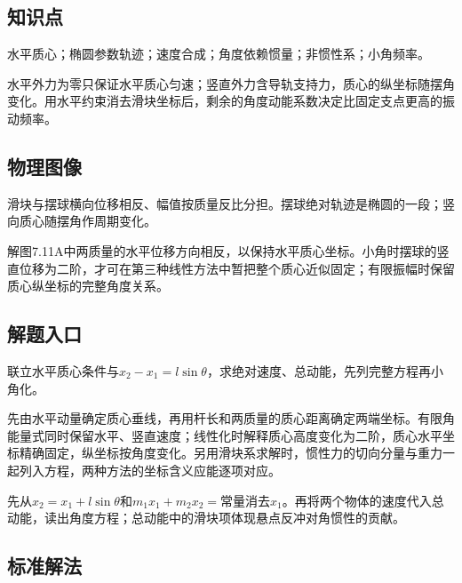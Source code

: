 \documentclass[UTF8,fontset=fandol,a4paper,11pt]{ctexart}
\begin{document}
\subsection*{知识点}

水平质心；椭圆参数轨迹；速度合成；角度依赖惯量；非惯性系；小角频率。

水平外力为零只保证水平质心匀速；竖直外力含导轨支持力，质心的纵坐标随摆角变化。用水平约束消去滑块坐标后，剩余的角度动能系数决定比固定支点更高的振动频率。




\subsection*{物理图像}

滑块与摆球横向位移相反、幅值按质量反比分担。摆球绝对轨迹是椭圆的一段；竖向质心随摆角作周期变化。

解图7.11A中两质量的水平位移方向相反，以保持水平质心坐标。小角时摆球的竖直位移为二阶，才可在第三种线性方法中暂把整个质心近似固定；有限振幅时保留质心纵坐标的完整角度关系。




\subsection*{解题入口}

联立水平质心条件与\(x_2-x_1=l\sin\theta\)，求绝对速度、总动能，先列完整方程再小角化。

先由水平动量确定质心垂线，再用杆长和两质量的质心距离确定两端坐标。有限角能量式同时保留水平、竖直速度；线性化时解释质心高度变化为二阶，质心水平坐标精确固定，纵坐标按角度变化。另用滑块系求解时，惯性力的切向分量与重力一起列入方程，两种方法的坐标含义应能逐项对应。

先从$x_2=x_1+l\sin\theta$和$m_1x_1+m_2x_2=\text{常量}$消去$x_1$。再将两个物体的速度代入总动能，读出角度方程；总动能中的滑块项体现悬点反冲对角惯性的贡献。





\subsection*{标准解法}
\end{document}
